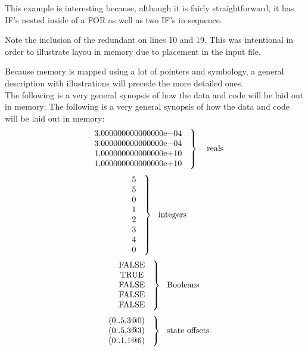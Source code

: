 This example is interesting because, although it is fairly straightforward,
it has IF's nested inside of a FOR as well as two IF's in sequence.

Note the inclusion of the redundant  on lines 10 and 19.  This
was intentional in order to illustrate layou in memory due to placement in
the input file.

Because memory is mapped using a lot of pointers and symbology, a general
description with illustrations will precede the more detailed ones.
\\
The following is a very general synopsis of how the data and code will be
laid out in memory:
The following is a very general synopsis of how the data and code will be
laid out in memory:
\[ \left. {\mbox{ \begin{tabular}{c}
3.000000000000000e$-$04 \\
3.000000000000000e$-$04 \\
1.000000000000000e$+$10 \\
1.000000000000000e$+$10 \\
\end{tabular} }} \right\}~~~ \mbox{reals} \]
\[ \left. {\mbox{ \begin{tabular}{c}
  5 \\
  5 \\
  0 \\
  1 \\
  2 \\
  3 \\
  4 \\
  0 \\
\end{tabular} }} \right\} ~~ \mbox{integers} \]
\[ \left. {\mbox{ \begin{tabular}{c}
 FALSE \\
 TRUE \\
 FALSE \\
 FALSE \\
 FALSE \\
\end{tabular} }} \right\} ~~ \mbox{Booleans} \]
\[ \left. {\mbox{ \begin{tabular}{c}
 (0..5,3@0) \\
 (0..5,3@3) \\
 (0..1,1@6) \\
\end{tabular} }} \right\} ~~ \mbox{state offsets} \]
